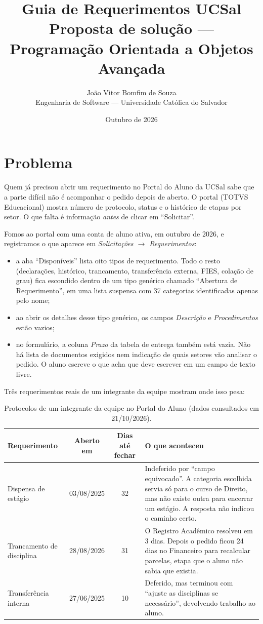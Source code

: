 \documentclass[12pt,a4paper]{article}
\title{Guia de Requerimentos UCSal\\[4pt]
\large Proposta de solução --- Programação Orientada a Objetos Avançada}
\author{João Vitor Bomfim de Souza\\
\small Engenharia de Software --- Universidade Católica do Salvador}
\date{Outubro de 2026}
\begin{document}
\maketitle

\section{Problema}

Quem já precisou abrir um requerimento no Portal do Aluno da UCSal sabe que a parte difícil não é
acompanhar o pedido depois de aberto. O portal (TOTVS Educacional) mostra número de protocolo, status
e o histórico de etapas por setor. O que falta é informação \emph{antes} de clicar em ``Solicitar''.

Fomos ao portal com uma conta de aluno ativa, em outubro de 2026, e registramos o que aparece em
\emph{Solicitações $\rightarrow$ Requerimentos}:

\begin{itemize}
  \item a aba ``Disponíveis'' lista oito tipos de requerimento. Todo o resto (declarações, histórico,
        trancamento, transferência externa, FIES, colação de grau) fica escondido dentro de um tipo
        genérico chamado ``Abertura de Requerimento'', em uma lista suspensa com 37 categorias
        identificadas apenas pelo nome;
  \item ao abrir os detalhes desse tipo genérico, os campos \emph{Descrição} e \emph{Procedimentos}
        estão vazios;
  \item no formulário, a coluna \emph{Prazo} da tabela de entrega também está vazia. Não há lista de
        documentos exigidos nem indicação de quais setores vão analisar o pedido. O aluno escreve o
        que acha que deve escrever em um campo de texto livre.
\end{itemize}

Três requerimentos reais de um integrante da equipe mostram onde isso pesa:

\begin{table}[H]
\centering
\small
\begin{tabularx}{\textwidth}{@{}lccX@{}}
\toprule
Requerimento & Aberto em & Dias até fechar & O que aconteceu \\
\midrule
Dispensa de estágio & 03/08/2025 & 32 &
  Indeferido por ``campo equivocado''. A categoria escolhida servia só para o curso de Direito,
  mas não existe outra para encerrar um estágio. A resposta não indicou o caminho certo. \\
\addlinespace
Trancamento de disciplina & 28/08/2026 & 31 &
  O Registro Acadêmico resolveu em 3 dias. Depois o pedido ficou 24 dias no Financeiro para
  recalcular parcelas, etapa que o aluno não sabia que existia. \\
\addlinespace
Transferência interna & 27/06/2025 & 10 &
  Deferido, mas terminou com ``ajuste as disciplinas se necessário'', devolvendo trabalho ao aluno. \\
\bottomrule
\end{tabularx}
\caption{Protocolos de um integrante da equipe no Portal do Aluno (dados consultados em 21/10/2026).}
\end{table}
\end{document}

